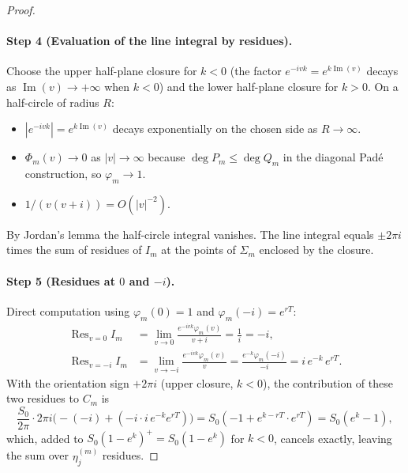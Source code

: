 \documentclass{article}
\begin{document}
\begin{proof}
\paragraph{Step 4 (Evaluation of the line integral by residues).}
Choose the upper half-plane closure for $k < 0$ (the factor
$e^{-ivk} = e^{k\operatorname{Im}(v)}$ decays as
$\operatorname{Im}(v)\to+\infty$ when $k<0$) and the lower
half-plane closure for $k > 0$.  On a half-circle of radius $R$:
\begin{itemize}
  \item $|e^{-ivk}| = e^{k\operatorname{Im}(v)}$ decays exponentially
    on the chosen side as $R\to\infty$.
  \item $\Phi_m(v)\to 0$ as $|v|\to\infty$ because
    $\deg P_m \le \deg Q_m$ in the diagonal Pad\'e construction,
    so $\varphi_m\to 1$.
  \item $1/(v(v+i)) = O(|v|^{-2})$.
\end{itemize}
By Jordan's lemma the half-circle integral vanishes.  The line
integral equals $\pm 2\pi i$ times the sum of residues of $I_m$ at
the points of $\Sigma_m$ enclosed by the closure.

\paragraph{Step 5 (Residues at $0$ and $-i$).}
Direct computation using $\varphi_m(0)=1$ and
$\varphi_m(-i)=e^{rT}$:
\begin{align}
  \operatorname{Res}_{v=0} I_m
    &= \lim_{v\to 0}\frac{e^{-ivk}\varphi_m(v)}{v+i}
    = \frac{1}{i} = -i,\label{eq:res0}\\
  \operatorname{Res}_{v=-i} I_m
    &= \lim_{v\to -i}\frac{e^{-ivk}\varphi_m(v)}{v}
    = \frac{e^{-k}\varphi_m(-i)}{-i}
    = i\,e^{-k}\,e^{rT}.\label{eq:resmi}
\end{align}
With the orientation sign $+2\pi i$ (upper closure, $k < 0$), the
contribution of these two residues to $C_m$ is
\begin{equation}\label{eq:intrinsic_check}
  \frac{S_0}{2\pi}\cdot 2\pi i\bigl(-(-i)+(-i\cdot i\,e^{-k}e^{rT})\bigr)
  = S_0(-1 + e^{k-rT}\cdot e^{rT}) = S_0(e^k - 1),
\end{equation}
which, added to $S_0(1-e^k)^+ = S_0(1-e^k)$ for $k<0$, cancels
exactly, leaving the sum over $\eta_j^{(m)}$ residues.


\end{proof}
\end{document}
